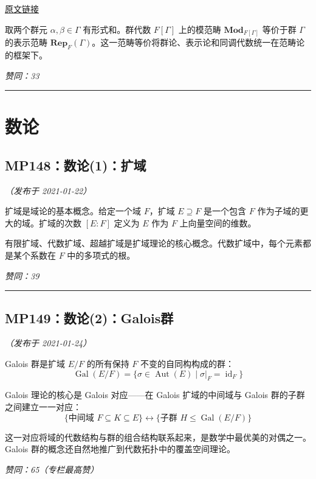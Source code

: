 \documentclass[10pt, openany]{book}
\begin{document}
\href{https://zhuanlan.zhihu.com/p/55982596}{原文链接}

取两个群元 $\alpha, \beta \in \Gamma$ 有形式和。群代数 $F[\Gamma]$ 上的模范畴 $\textbf{Mod}_{F[\Gamma]}$ 等价于群 $\Gamma$ 的表示范畴 $\textbf{Rep}_F(\Gamma)$。这一范畴等价将群论、表示论和同调代数统一在范畴论的框架下。

\textit{赞同：33}

\medskip
\noindent\rule{\textwidth}{0.4pt}

\chapter{数论}

\section{MP148：数论(1)：扩域}
\label{sec:mp148}

\textit{（发布于 2021-01-22）}

扩域是域论的基本概念。给定一个域 $F$，扩域 $E \supseteq F$ 是一个包含 $F$ 作为子域的更大的域。扩域的次数 $[E:F]$ 定义为 $E$ 作为 $F$ 上向量空间的维数。

有限扩域、代数扩域、超越扩域是扩域理论的核心概念。代数扩域中，每个元素都是某个系数在 $F$ 中的多项式的根。

\textit{赞同：39}

\medskip
\noindent\rule{\textwidth}{0.4pt}

\section{MP149：数论(2)：Galois群}
\label{sec:mp149}

\textit{（发布于 2021-01-24）}

Galois 群是扩域 $E/F$ 的所有保持 $F$ 不变的自同构构成的群：
\[
\operatorname{Gal}(E/F) = \{\sigma \in \operatorname{Aut}(E) \mid \sigma|_F = \operatorname{id}_F\}
\]

Galois 理论的核心是 Galois 对应——在 Galois 扩域的中间域与 Galois 群的子群之间建立一一对应：
\[
\{\text{中间域 } F \subseteq K \subseteq E\} \longleftrightarrow \{\text{子群 } H \leq \operatorname{Gal}(E/F)\}
\]

这一对应将域的代数结构与群的组合结构联系起来，是数学中最优美的对偶之一。Galois 群的概念还自然地推广到代数拓扑中的覆盖空间理论。

\textit{赞同：65（专栏最高赞）}
\end{document}
